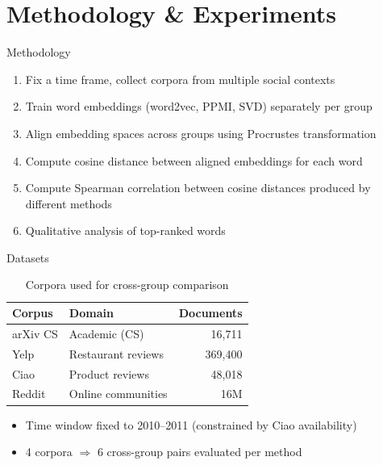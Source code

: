 \documentclass[aspectratio=169]{beamer}
\begin{document}
\section{Methodology \& Experiments}

\begin{frame}{Methodology}
    \begin{enumerate}
        \item Fix a time frame, collect corpora from multiple social contexts
        \item Train word embeddings (word2vec, PPMI, SVD) separately per group
        \item Align embedding spaces across groups using Procrustes transformation
        \item Compute cosine distance between aligned embeddings for each word
        \item Compute Spearman correlation between cosine distances produced by different methods
        \item Qualitative analysis of top-ranked words
    \end{enumerate}
\end{frame}

\begin{frame}{Datasets}
    \begin{table}[h]
        \centering
        \begin{tabular}{llr}
            \toprule
            Corpus & Domain & Documents \\
            \midrule
            arXiv CS & Academic (CS) & 16,711 \\
            Yelp     & Restaurant reviews & 369,400 \\
            Ciao     & Product reviews & 48,018 \\
            Reddit   & Online communities & 16M \\
            \bottomrule
        \end{tabular}
        \caption{Corpora used for cross-group comparison}
    \end{table}

    \begin{itemize}
        \item Time window fixed to 2010--2011 (constrained by Ciao availability)
        \item 4 corpora \( \Longrightarrow \) 6 cross-group pairs evaluated per method
    \end{itemize}
\end{frame}
\end{document}
